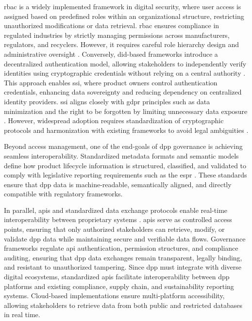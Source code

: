 \ac{rbac} is a widely implemented framework in digital security, where user access is assigned based on predefined roles within an organizational structure, restricting unauthorized modifications or data retrieval. \ac{rbac} ensures compliance in regulated industries by strictly managing permissions across manufacturers, regulators, and recyclers. However, it requires careful role hierarchy design and administrative oversight \autocite{Ferraiolo.1992}. Conversely, \ac{did}-based frameworks introduce a decentralized authentication model, allowing stakeholders to independently verify identities using cryptographic credentials without relying on a central authority \autocite{Garcia.2024}. This approach enables \ac{ssi}, where product owners control authentication credentials, enhancing data sovereignty and reducing dependency on centralized identity providers. \ac{ssi} aligns closely with \ac{gdpr} principles such as data minimization and the right to be forgotten by limiting unnecessary data exposure \autocite{EuropeanParliamentandCouncil.2016, Hulea.2024}. However, widespread adoption requires standardization of cryptographic protocols and harmonization with existing frameworks to avoid legal ambiguities \autocite{Dalipi.2024}.

Beyond access management, one of the end-goals of \ac{dpp} governance is achieving seamless interoperability. Standardized metadata formats and semantic models define how product lifecycle information is structured, classified, and validated to comply with legislative reporting requirements such as the \ac{espr} \autocite{Reif.2024}. These standards ensure that \ac{dpp} data is machine-readable, semantically aligned, and directly compatible with regulatory frameworks.

In parallel, \ac{api}s and standardized data exchange protocols enable real-time interoperability between proprietary systems \autocite{Jansen.2023}. \ac{api}s serve as controlled access points, ensuring that only authorized stakeholders can retrieve, modify, or validate \ac{dpp} data while maintaining secure and verifiable data flows. Governance frameworks regulate \ac{api} authentication, permission structures, and compliance auditing, ensuring that \ac{dpp} data exchanges remain transparent, legally binding, and resistant to unauthorized tampering. Since \ac{dpp} must integrate with diverse digital ecosystems, standardized \ac{api}s facilitate interoperability between \ac{dpp} platforms and existing compliance, supply chain, and sustainability reporting systems. Cloud-based implementations ensure multi-platform accessibility, allowing stakeholders to retrieve data from both public and restricted databases in real time. \autocite{Redeker.2024}

